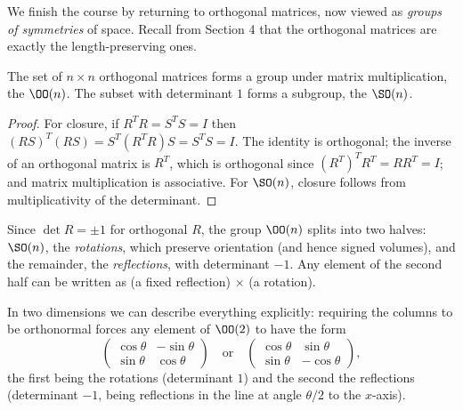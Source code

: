 We finish the course by returning to orthogonal matrices, now viewed as \emph{groups of symmetries} of space. Recall from Section 4 that the orthogonal matrices are exactly the length-preserving ones.

\begin{proposition}
	The set of $n \times n$ orthogonal matrices forms a group under matrix multiplication, the  $\OO(n)$. The subset with determinant $1$ forms a subgroup, the  $\SO(n)$.
\end{proposition}
\begin{proof}
	For closure, if $R^TR = S^TS = I$ then $(RS)^T(RS) = S^T(R^TR)S = S^TS = I$. The identity is orthogonal; the inverse of an orthogonal matrix is $R^T$, which is orthogonal since $(R^T)^TR^T = RR^T = I$; and matrix multiplication is associative. For $\SO(n)$, closure follows from multiplicativity of the determinant.
\end{proof}

Since $\det R = \pm 1$ for orthogonal $R$, the group $\OO(n)$ splits into two halves: $\SO(n)$, the \emph{rotations}, which preserve orientation (and hence signed volumes), and the remainder, the \emph{reflections}, with determinant $-1$. Any element of the second half can be written as (a fixed reflection) $\times$ (a rotation).

In two dimensions we can describe everything explicitly: requiring the columns to be orthonormal forces any element of $\OO(2)$ to have the form
$$
\begin{pmatrix}
	\cos\theta & -\sin\theta \\
	\sin\theta & \cos\theta
\end{pmatrix}
\quad \text{or} \quad
\begin{pmatrix}
	\cos\theta & \sin\theta \\
	\sin\theta & -\cos\theta
\end{pmatrix},
$$
the first being the rotations (determinant $1$) and the second the reflections (determinant $-1$, being reflections in the line at angle $\theta/2$ to the $x$-axis).

\begin{center}
\end{center}

